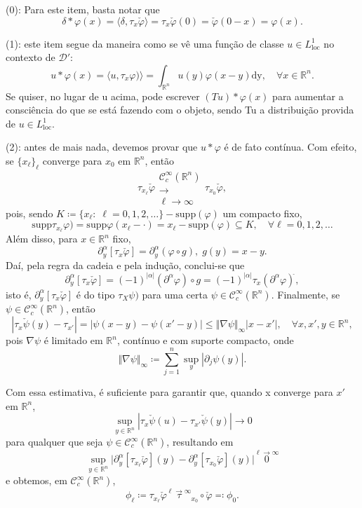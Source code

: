 \documentclass[../distribution_theory_notes.tex]{subfiles}
\begin{document}
\begin{proof*}
	(0): Para este item, basta notar que
	\[
		\delta *\varphi (x) = \langle \delta , \tau_{x}\check{\varphi } \rangle = \tau_{x}\check{\varphi }(0) = \check{\varphi }(0-x) = \varphi (x).
	\]

	(1): este item segue da maneira como se vê uma função de classe \(u\in L_{\mathrm{loc}}^{1}\) no contexto de \(\mathcal{D}'\):
	\[
		u*\varphi (x) = \langle u, \tau_{x}{\varphi}) \rangle = \int_{\mathbb{R}^{n}}^{}u(y)\varphi (x-y) \mathrm{dy},\quad \forall x\in \mathbb{R}^{n}.
	\]
	Se quiser, no lugar de u acima, pode escrever \((Tu)*\varphi (x)\) para aumentar a consciência do que se está fazendo com o objeto, sendo Tu a distribuição provida de \(u\in L_{\mathrm{loc}}^{1}\).

	(2): antes de mais nada, devemos provar que \(u*\varphi \) é de fato contínua. Com efeito, se \(\{x_{\ell}\}_{\ell}\) converge para \(x_{0}\) em \(\mathbb{R}^{n}\), então
	\[
		\tau_{x_{\ell}}\check{\varphi }\substack{ \mathcal{C}_{c}^{\infty}(\mathbb{R}^{n})\\ \longrightarrow \\ \ell \to \infty}\tau_{x_{0}}\check{\varphi },
	\]
	pois, sendo \(K\coloneqq \{x_{\ell}:\; \ell =0,1,2,\dotsc \} - \mathrm{supp}(\varphi )\) um compacto fixo,
	\[
		\mathrm{supp} \tau_{x_{\ell}}{\varphi }) = \mathrm{supp} \varphi(x_{\ell } - \cdot ) = x_{\ell}-\mathrm{supp}(\varphi )\subseteq K, \quad \forall \ell = 0, 1, 2, \dotsc
	\]
	Além disso, para \(x\in \mathbb{R}^{n}\) fixo,
	\[
		\partial_{y}^{\alpha }[\tau_{x}\check{\varphi }] = \partial_{y}^{\alpha }(\varphi \circ g),\; g(y) = x-y.
	\]
	Daí, pela regra da cadeia e pela indução, conclui-se que
	\[
		\partial_{y}^{\alpha }[\tau_{x}\check{\varphi }] = (-1)^{| \alpha  |}(\partial^{\alpha }\varphi )\circ g = (-1)^{|\alpha |}\tau_{x}(\partial^{\alpha }\varphi )^{\check{}},
	\]
	isto é, \(\partial_{y}^{\alpha }[\tau_{x}\check{\varphi }]\) é do tipo \(\tau_{X}{\psi} )\) para uma certa \(\psi\in \mathcal{C}_{c}^{\infty}(\mathbb{R}^{n}).\) Finalmente, se \(\psi \in \mathcal{C}_{c}^{\infty}(\mathbb{R}^{n})\), então
	\[
		| \tau_{x}\check{\psi }(y) - \tau_{x'} | = | \psi(x-y) - \psi(x'-y) | \leq \Vert \nabla \psi  \Vert_{\infty}| x-x' |,\quad \forall x, x', y\in \mathbb{R}^{n},
	\]
	pois \(\nabla \psi \) é limitado em \(\mathbb{R}^{n}\), contínuo e com suporte compacto, onde
	\[
		\biggl\Vert \nabla \psi  \biggr\Vert_{\infty}\coloneqq \sum\limits_{j=1}^{n}\sup_{y}| \partial_{j}\psi(y) |.
	\]

	Com essa estimativa, é suficiente para garantir que, quando x converge para \(x'\) em \(\mathbb{R}^{n}\),
	\[
		\sup_{y\in \mathbb{R}^{n}}| \tau_{x}\check{\psi }(u) - \tau_{x'}\check{\psi }(y) |\rightarrow 0
	\]
	para qualquer que seja \(\psi \in \mathcal{C}_{c}^{\infty}(\mathbb{R}^{n})\), resultando em
	\[
		\sup_{y\in \mathbb{R}^{n}}\biggl\vert \partial_{y}^{\alpha }[\tau_{x_{\ell}}\check{\varphi }](y) - \partial_{y}^{\alpha }[\tau_{x_{0}}\check{\varphi }](y) \biggr\vert\stackrel{\ell \to \infty}0
	\]
	e obtemos, em \(\mathcal{C}_{c}^{\infty}(\mathbb{R}^{n})\),
	\[
		\phi_{\ell} \coloneqq \tau_{x_{\ell}}\check{\varphi }\stackrel{\ell \to \infty}\tau_{x_{0}}\circ \check{\varphi }\eqqcolon \phi_{0}.
	\]


\end{proof*}
\end{document}
